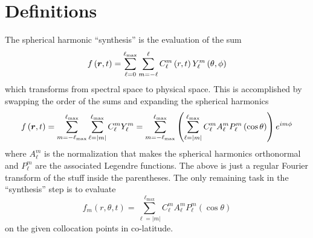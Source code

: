 \documentclass[10pt,letterpaper]{article}
\begin{document}
\section{Definitions}
The spherical harmonic ``synthesis'' is the evaluation of the sum
\begin{equation}
 f\left(\bm{r},t\right) = \sum\limits_{\ell=0}^{\ell_\mathrm{max}}
                                 \sum\limits_{m=-\ell}^{\ell}
                C_\ell^m\left(r,t\right) Y_\ell^m\left(\theta,\phi\right)
\end{equation}
which transforms from spectral space to physical space. This is accomplished by
swapping the order of the sums and expanding the spherical harmonics
\begin{equation}
 f\left(\bm{r},t\right) =
           \sum\limits_{m=-\ell_{\mathrm{max}}}^{\ell_\mathrm{max}}
                 \sum\limits_{\ell=|m|}^{\ell_\mathrm{max}}
                 C_\ell^m Y_\ell^m
          =
           \sum\limits_{m=-\ell_{\mathrm{max}}}^{\ell_\mathrm{max}}
            \left(
                 \sum\limits_{\ell=|m|}^{\ell_\mathrm{max}}
                    C_\ell^m A_\ell^m P_\ell^m\left(\cos\theta\right)
            \right)
              e^{i m\phi}
\end{equation}
where $A_\ell^m$ is the normalization that makes the spherical harmonics orthonormal
and $P_\ell^m$ are the associated Legendre functions. The above is just a
regular Fourier transform of the stuff inside the parentheses.
The only remaining task in the ``synthesis'' step is to evaluate
\begin{equation}
 f_m\left(r,\theta,t\right) =
                 \sum\limits_{\ell=|m|}^{\ell_\mathrm{max}}
                    C_\ell^m A_\ell^m P_\ell^m\left(\cos\theta\right)
\end{equation}
on the given collocation points in co-latitude.
\end{document}
